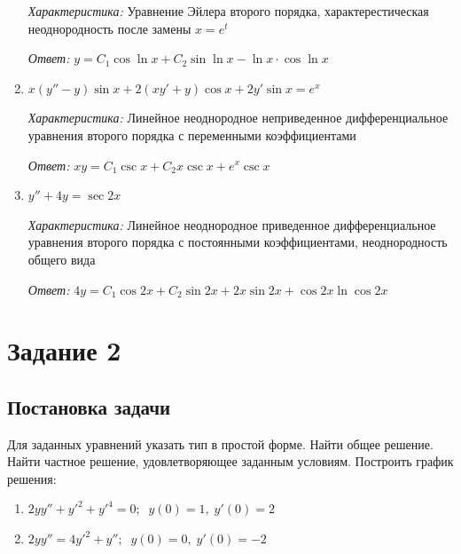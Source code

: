 \documentclass[a4paper, 14pt, fleqn]{extarticle}
\begin{document}
\begin{enumerate}
					\textit{Характеристика:} Уравнение Эйлера второго порядка, характерестическая неоднородность после замены \( x = e^t \)
		
					\textit{Ответ:} \( y = C_1\cos{\ln{x}} + C_2\sin{\ln{x}} - \ln{x} \cdot \cos{\ln{x}}\)

				\item \( x(y''-y)\sin{x} + 2(xy' + y)\cos{x} + 2y'\sin{x} = e^x \)

					\textit{Характеристика:}  Линейное неоднородное неприведенное дифференциальное уравнения второго порядка с переменными коэффициентами
		
					\textit{Ответ:} \( xy = C_1\csc{x} + C_2x\csc{x} + e^x\csc{x} \)
 				\item \( y'' + 4y = \sec{2x} \)

					\textit{Характеристика:}  Линейное неоднородное приведенное дифференциальное уравнения второго порядка с постоянными коэффициентами, неоднородность общего вида
		
					\textit{Ответ:} \( 4y = C_1\cos{2x} + C_2\sin{2x} + 2x\sin{2x} + \cos{2x}\ln{\cos{2x}} \)

			\end{enumerate}

	\pagebreak
	\section{Задание 2}
		\subsection{Постановка задачи}
			\noindent Для заданных уравнений указать тип в простой форме. Найти общее решение. Найти частное решение, удовлетворяющее заданным условиям. Построить
					график решения:
			\begin{enumerate}
				\item \(2yy'' + y'^2 + y'^4 = 0;\;\; y(0) = 1,\; y'(0) = 2\)
				\item \(2yy'' = 4y'^2 + y'';\;\; y(0) = 0,\; y'(0) = -2\) 
			\end{enumerate}
\end{document}
